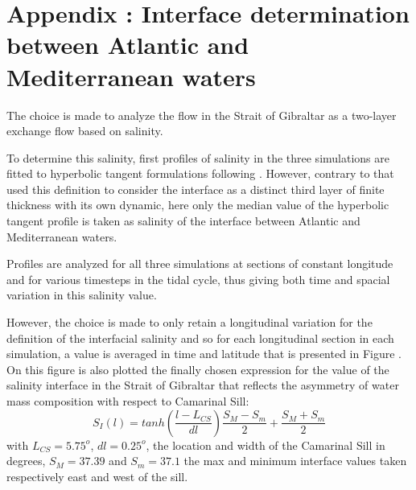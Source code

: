  \color{red}
\section{Appendix : Interface determination between Atlantic and Mediterranean waters}
\label{appendix_interface}

The choice is made to analyze the flow in the Strait of Gibraltar as a two-layer exchange flow based on salinity. 

To determine this salinity, first profiles of salinity in the three simulations are fitted to hyperbolic tangent formulations following \citet{sannino_2007}. However, contrary to \citet{sannino_2007} that used this definition to consider the interface as a distinct third layer of finite thickness with its own dynamic, here only the median value of the hyperbolic tangent profile is taken as salinity of the interface between Atlantic and Mediterranean waters. 


Profiles are analyzed for all three simulations at sections of constant longitude and for various timesteps in the tidal cycle, thus giving both time and spacial variation in this salinity value.

However, the choice is made to only retain a longitudinal variation for the definition of the interfacial salinity and so for each longitudinal section in each simulation, a value is averaged in time and latitude that is presented in Figure . On this figure is also plotted the finally chosen expression for the value of the salinity interface in the Strait of Gibraltar that reflects the asymmetry of water mass composition with respect to Camarinal Sill:
\begin{equation}
	S_I(l)=tanh(\frac{l-L_{CS}}{dl})\frac{S_M-S_m}{2}+\frac{S_M+S_m}{2}
	\label{eqSinterfaceApp}
\end{equation}
with $L_{CS}=5.75^o$, $dl=0.25^o$, the location and width of the Camarinal Sill in degrees, $S_M=37.39$ and $S_m=37.1$ the max and minimum interface values taken respectively east and west of the sill.

